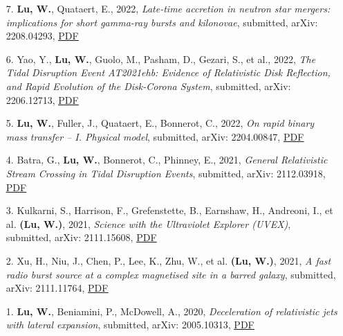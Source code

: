 \begin{itemize}[leftmargin=0.65cm]
\vspace{-0.1cm}
\item[7.]{{\bf Lu, W.}, Quataert, E., 2022, {\it Late-time accretion in neutron star mergers: implications for short gamma-ray bursts and kilonovae}, submitted, arXiv: 2208.04293, \href{https://ui.adsabs.harvard.edu/abs/2022arXiv220804293L}{\underline{PDF}}}

\vspace{-0.1cm}
\item[6.]{Yao, Y., {\bf Lu, W.}, Guolo, M., Pasham, D., Gezari, S., et al., 2022, {\it The Tidal Disruption Event AT2021ehb: Evidence of Relativistic Disk Reflection, and Rapid Evolution of the Disk-Corona System}, submitted, arXiv: 2206.12713, \href{https://ui.adsabs.harvard.edu/abs/2022arXiv220612713Y}{\underline{PDF}}}

\vspace{-0.1cm}
\item[5.]{{\bf Lu, W.}, Fuller, J., Quataert, E., Bonnerot, C., 2022, {\it On rapid binary mass transfer -- I. Physical model}, submitted, arXiv: 2204.00847, \href{https://ui.adsabs.harvard.edu/abs/2022arXiv220400847L}{\underline{PDF}}}

\vspace{-0.1cm}
\item[4.]{Batra, G., {\bf Lu, W.}, Bonnerot, C., Phinney, E., 2021, {\it General Relativistic Stream Crossing in Tidal Disruption Events}, submitted, arXiv: 2112.03918, \href{https://ui.adsabs.harvard.edu/abs/2021arXiv211203918B}{\underline{PDF}}}

\vspace{-0.1cm}
\item[3.]{Kulkarni, S., Harrison, F., Grefenstette, B., Earnshaw, H., Andreoni, I., et al. {\bf (Lu, W.)}, 2021, {\it Science with the Ultraviolet Explorer (UVEX)}, submitted, arXiv: 2111.15608, \href{https://ui.adsabs.harvard.edu/abs/2021arXiv211115608K}{\underline{PDF}}}

\vspace{-0.1cm}
\item[2.]{Xu, H., Niu, J., Chen, P., Lee, K., Zhu, W., et al. {\bf (Lu, W.)}, 2021, {\it A fast radio burst source at a complex magnetised site in a barred galaxy}, submitted, arXiv: 2111.11764, \href{https://ui.adsabs.harvard.edu/abs/2021arXiv211111764X}{\underline{PDF}}}

\vspace{-0.1cm}
\item[1.]{{\bf Lu, W.}, Beniamini, P., McDowell, A., 2020, {\it Deceleration of relativistic jets with lateral expansion}, submitted, arXiv: 2005.10313, \href{https://ui.adsabs.harvard.edu/abs/2020arXiv200510313L}{\underline{PDF}}}
\end{itemize}